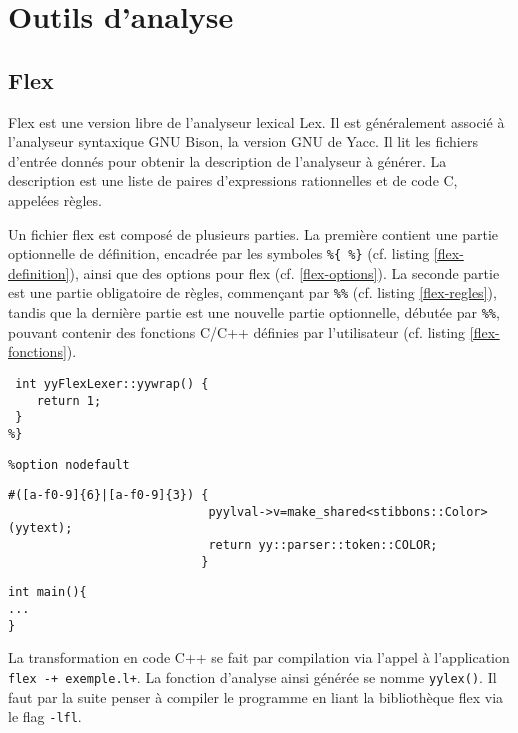 \section{Outils d'analyse}

\subsection{Flex}

Flex est une version libre de l'analyseur lexical Lex. Il est généralement associé à l'analyseur syntaxique GNU Bison, la version GNU de Yacc.
Il lit les fichiers d'entrée donnés pour obtenir la description de l'analyseur à générer. La description est une liste de paires d'expressions rationnelles et de code C, appelées règles. 

Un fichier flex est composé de plusieurs parties. La première contient une partie optionnelle de définition, encadrée par les symboles \verb|%{ %}| (cf. listing \ref{flex-definition}), ainsi que des options pour flex (cf. \ref{flex-options}). La seconde partie est une partie obligatoire de règles, commençant par \verb|%%| (cf. listing \ref{flex-regles}), tandis que la dernière partie est une nouvelle partie optionnelle, débutée par \verb|%%|, pouvant contenir des fonctions C/C++ définies par l'utilisateur (cf. listing \ref{flex-fonctions}).

\begin{lstlisting}[caption=Partie définition d'un fichier flex,label=flex-definition]
%{
 int yyFlexLexer::yywrap() {
	return 1;
 }
%}
\end{lstlisting}

\begin{lstlisting}[caption=Options flex,label=flex-options]
%option c++ 
%option nodefault 
\end{lstlisting}


\begin{lstlisting}[label=flex-regles,caption=Partie règles de flex]
%%
#([a-f0-9]{6}|[a-f0-9]{3}) {
							pyylval->v=make_shared<stibbons::Color>(yytext); 
							return yy::parser::token::COLOR;
						   }
\end{lstlisting}
\begin{lstlisting}[label=flex-fonctions,caption=Partie fonctions de flex]
%%
int main(){
...
}
\end{lstlisting}

La transformation en code C++ se fait par compilation via l'appel à l'application \verb|flex -+ exemple.l+|. La fonction d'analyse ainsi générée se nomme \verb|yylex()|.
Il faut par la suite penser à compiler le programme en liant la bibliothèque flex via le flag \verb|-lfl|.

